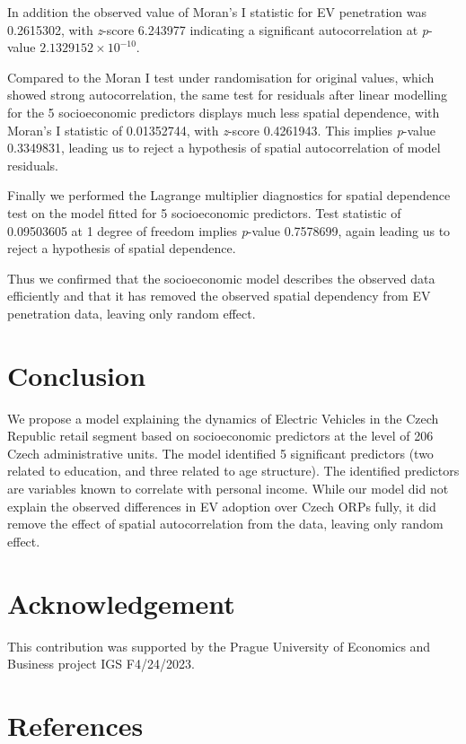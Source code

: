 \documentclass{mmeproc}
\begin{document}
In addition the observed value of Moran's I statistic for EV penetration
was 0.2615302, with \emph{z}-score 6.243977 indicating a significant
autocorrelation at \emph{p}-value \ensuremath{2.1329152\times 10^{-10}}.

Compared to the Moran I test under randomisation for original values,
which showed strong autocorrelation, the same test for residuals after
linear modelling for the 5 socioeconomic predictors displays much less
spatial dependence, with Moran's I statistic of 0.01352744, with
\emph{z}-score 0.4261943. This implies \emph{p}-value 0.3349831, leading
us to reject a hypothesis of spatial autocorrelation of model residuals.

Finally we performed the Lagrange multiplier diagnostics for spatial
dependence test on the model fitted for 5 socioeconomic predictors. Test
statistic of 0.09503605 at 1 degree of freedom implies \emph{p}-value
0.7578699, again leading us to reject a hypothesis of spatial
dependence.

Thus we confirmed that the socioeconomic model describes the observed
data efficiently and that it has removed the observed spatial dependency
from EV penetration data, leaving only random effect.

\hypertarget{conclusion}{%
\section{Conclusion}\label{conclusion}}

We propose a model explaining the dynamics of Electric Vehicles in the
Czech Republic retail segment based on socioeconomic predictors at the
level of 206 Czech administrative units. The model identified 5
significant predictors (two related to education, and three related to
age structure). The identified predictors are variables known to
correlate with personal income. While our model did not explain the
observed differences in EV adoption over Czech ORPs fully, it did remove
the effect of spatial autocorrelation from the data, leaving only random
effect.

\hypertarget{acknowledgement}{%
\section{Acknowledgement}\label{acknowledgement}}

This contribution was supported by the Prague University of Economics
and Business project IGS F4/24/2023.

\hypertarget{references}{%
\section{References}\label{references}}
\end{document}

